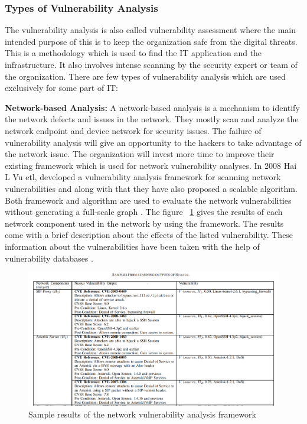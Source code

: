 \subsubsection{Types of Vulnerability Analysis}
The vulnerability analysis is also called vulnerability assessment where the main intended purpose of this is to keep the organization safe from the digital threats. This is a methodology which is used to find the IT application and the infrastructure. It also involves intense scanning by the security expert or team of the organization. There are few types of vulnerability analysis which are used exclusively for some part of IT:

{\bf Network-based Analysis:} A network-based analysis is a mechanism to identify the network defects and issues in the network. They mostly scan and analyze the network endpoint and device network for security issues. The failure of vulnerability analysis will give an opportunity to the hackers to take advantage of the network issue. The organization will invest more time to improve their existing framework which is used for network vulnerability analyses. In 2008 Hai L Vu etl, developed a vulnerability analysis framework for scanning network vulnerabilities and along with that they have also proposed a scalable algorithm. Both framework and algorithm are used to evaluate the network vulnerabilities without generating a full-scale graph \cite{VuKhChFe2008}. The figure ~\ref{fig:networkanalysis} gives the results of each network component used in the network by using the framework. The results come with a brief description about the effects of the listed vulnerability. These information about the vulnerabilities have been taken with the help of vulnerability databases \cite{VuKhChFe2008}.

\begin{figure}[h!]
	\includegraphics[width=15cm]{includes/networkanalysis.png}
	\centering
	\caption{Sample results of the network vulnerability analysis framework \cite{VuKhChFe2008}}
	\label{fig:networkanalysis}
\end{figure}

